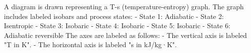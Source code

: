 A diagram is drawn representing a T-s (temperature-entropy) graph. The graph includes labeled isobars and process states:  
- State 1: Adiabatic  
- State 2: Isentropic  
- State 3: Isobaric  
- State 4: Isobaric  
- State 5: Isobaric  
- State 6: Adiabatic reversible  
The axes are labeled as follows:  
- The vertical axis is labeled "T in K".  
- The horizontal axis is labeled "s in kJ/kg·K".
